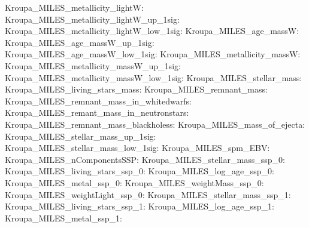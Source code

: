 Kroupa\_MILES\_metallicity\_lightW:  \newline 
Kroupa\_MILES\_metallicity\_lightW\_up\_1sig:  \newline 
Kroupa\_MILES\_metallicity\_lightW\_low\_1sig:  \newline 
Kroupa\_MILES\_age\_massW:  \newline 
Kroupa\_MILES\_age\_massW\_up\_1sig:  \newline 
Kroupa\_MILES\_age\_massW\_low\_1sig:  \newline 
Kroupa\_MILES\_metallicity\_massW:  \newline 
Kroupa\_MILES\_metallicity\_massW\_up\_1sig:  \newline 
Kroupa\_MILES\_metallicity\_massW\_low\_1sig:  \newline 
Kroupa\_MILES\_stellar\_mass:  \newline 
Kroupa\_MILES\_living\_stars\_mass:  \newline 
Kroupa\_MILES\_remnant\_mass:  \newline 
Kroupa\_MILES\_remnant\_mass\_in\_whitedwarfs:  \newline 
Kroupa\_MILES\_remant\_mass\_in\_neutronstars:  \newline 
Kroupa\_MILES\_remnant\_mass\_blackholess:  \newline 
Kroupa\_MILES\_mass\_of\_ejecta:  \newline 
Kroupa\_MILES\_stellar\_mass\_up\_1sig:  \newline 
Kroupa\_MILES\_stellar\_mass\_low\_1sig:  \newline 
Kroupa\_MILES\_spm\_EBV:  \newline 
Kroupa\_MILES\_nComponentsSSP:  \newline 
Kroupa\_MILES\_stellar\_mass\_ssp\_0:  \newline 
Kroupa\_MILES\_living\_stars\_ssp\_0:  \newline 
Kroupa\_MILES\_log\_age\_ssp\_0:  \newline 
Kroupa\_MILES\_metal\_ssp\_0:  \newline 
Kroupa\_MILES\_weightMass\_ssp\_0:  \newline 
Kroupa\_MILES\_weightLight\_ssp\_0:  \newline 
Kroupa\_MILES\_stellar\_mass\_ssp\_1:  \newline 
Kroupa\_MILES\_living\_stars\_ssp\_1:  \newline 
Kroupa\_MILES\_log\_age\_ssp\_1:  \newline 
Kroupa\_MILES\_metal\_ssp\_1:  \newline 
